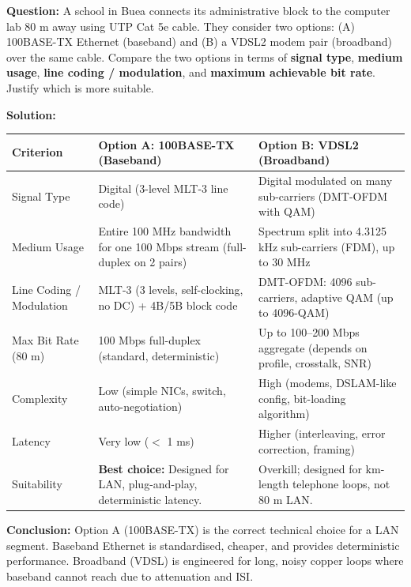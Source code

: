 \documentclass[11pt]{article}
\begin{document}
\begin{exoresolu}
\textbf{Question:} A school in Buea connects its administrative block to the computer lab 80 m away using UTP Cat 5e cable. They consider two options: (A) 100BASE-TX Ethernet (baseband) and (B) a VDSL2 modem pair (broadband) over the same cable. Compare the two options in terms of \textbf{signal type}, \textbf{medium usage}, \textbf{line coding / modulation}, and \textbf{maximum achievable bit rate}. Justify which is more suitable.

\textbf{Solution:}
\begin{center}
\begin{tabularx}{\linewidth}{|l|X|X|}
\hline
\rowcolor{popblueL}
\textbf{Criterion} & \textbf{Option A: 100BASE-TX (Baseband)} & \textbf{Option B: VDSL2 (Broadband)} \\
\hline
Signal Type & Digital (3-level MLT-3 line code) & Digital modulated on many sub-carriers (DMT-OFDM with QAM) \\
Medium Usage & Entire 100 MHz bandwidth for one 100 Mbps stream (full-duplex on 2 pairs) & Spectrum split into 4.3125 kHz sub-carriers (FDM), up to 30 MHz \\
Line Coding / Modulation & MLT-3 (3 levels, self-clocking, no DC) + 4B/5B block code & DMT-OFDM: 4096 sub-carriers, adaptive QAM (up to 4096-QAM) \\
Max Bit Rate (80 m) & 100 Mbps full-duplex (standard, deterministic) & Up to 100–200 Mbps aggregate (depends on profile, crosstalk, SNR) \\
Complexity & Low (simple NICs, switch, auto-negotiation) & High (modems, DSLAM-like config, bit-loading algorithm) \\
Latency & Very low ($<$ 1 ms) & Higher (interleaving, error correction, framing) \\
Suitability & \textbf{Best choice:} Designed for LAN, plug-and-play, deterministic latency. & Overkill; designed for km-length telephone loops, not 80 m LAN. \\
\hline
\end{tabularx}
\end{center}
\textbf{Conclusion:} Option A (100BASE-TX) is the correct technical choice for a LAN segment. Baseband Ethernet is standardised, cheaper, and provides deterministic performance. Broadband (VDSL) is engineered for long, noisy copper loops where baseband cannot reach due to attenuation and ISI.
\end{exoresolu}
\end{document}
